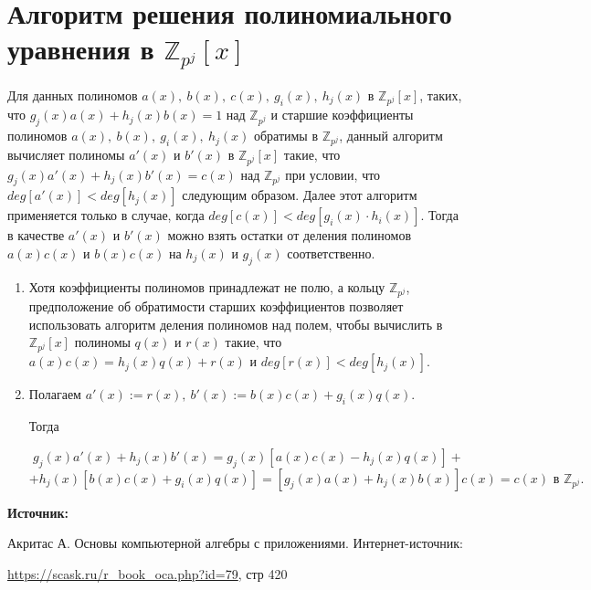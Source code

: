 \documentclass[12pt,a4paper]{scrartcl}
\begin{document}
	
\section{Алгоритм решения полиномиального уравнения в $\mathbb{Z}_{p^j}[x]$}

Для данных полиномов $a(x),\ b(x),\ c(x),\ g_i(x),\ h_j(x)$ в $\mathbb{Z}_{p^j}[x]$, таких, что $g_j(x)a(x)+h_j(x)b(x)=1$ над $\mathbb{Z}_{p^j}$ и старшие коэффициенты полиномов $a(x),\ b(x),\ g_i(x),\ h_j(x)$ обратимы в $\mathbb{Z}_{p^j}$, данный алгоритм вычисляет полиномы $a'(x)$ и $b'(x)$ в $\mathbb{Z}_{p^j}[x]$ такие, что $g_j(x)a'(x)+h_j(x)b'(x)=c(x)$ над $\mathbb{Z}_{p^j}$ при условии, что $deg[a'(x)]<deg[h_j(x)]$ следующим образом. Далее этот алгоритм применяется только в случае, когда $deg[c(x)]<deg[g_i(x)\cdot h_i(x)]$. Тогда в качестве $a'(x)$ и $b'(x)$ можно взять остатки от деления полиномов $a(x)c(x)$ и $b(x)c(x)$ на $h_j(x)$ и $g_j(x)$ соответственно.

\begin{enumerate}
	\item Хотя коэффициенты полиномов принадлежат не полю, а кольцу $\mathbb{Z}_{p^j}$, предположение об обратимости старших коэффициентов позволяет использовать алгоритм деления полиномов над полем, чтобы вычислить в $\mathbb{Z}_{p^j}[x]$ полиномы $q(x)$ и $r(x)$ такие, что $a(x)c(x)=h_j(x)q(x)+r(x)$ и $deg[r(x)]<deg[h_j(x)]$.
	
	\item Полагаем $a'(x) := r(x),\ b'(x) :=b(x)c(x)+g_i(x)q(x)$.
	
	Тогда
	
	$$g_j(x)a'(x)+h_j(x)b'(x)=g_j(x)[a(x)c(x)-h_j(x)q(x)]+$$
	$$+h_j(x)[b(x)c(x)+g_i(x)q(x)]=[g_j(x)a(x)+h_j(x)b(x)]c(x)=c(x)\text{ в } \mathbb{Z}_{p^j}.$$
	
\end{enumerate}

\textbf{Источник:}

Акритас А. Основы компьютерной алгебры с приложениями. Интернет-источник:

\href{https://scask.ru/r_book_oca.php?id=79}{https://scask.ru/r\_book\_oca.php?id=79}, стр 420
	
\end{document}

